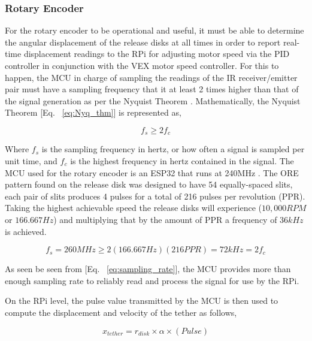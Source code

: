 
\subsubsection{Rotary Encoder}

\indent\indent For the rotary encoder to be operational and useful, it must be able to determine the angular displacement of the release disks at all times in order to report real-time displacement readings to the RPi for adjusting motor speed via the PID controller in conjunction with the VEX motor speed controller. For this to happen, the MCU in charge of sampling the readings of the IR receiver/emitter pair must have a sampling frequency that it at least 2 times higher than that of the signal generation as per the Nyquist Theorem \cite{Nyq_thm}. Mathematically, the Nyquist Theorem [Eq. ~\ref{eq:Nyq_thm}] is represented as,

\begin{equation}
	f_s \geq 2f_c
    \label{eq:Nyq_thm}
\end{equation}

Where $f_s$ is the sampling frequency in hertz, or how often a signal is sampled per unit time, and $f_c$ is the highest frequency in hertz contained in the signal. The MCU used for the rotary encoder is an ESP32 that runs at 240MHz \cite{espressif}. The ORE pattern found on the release disk was designed to have 54 equally-spaced slits, each pair of slits produces 4 pulses for a total of 216 pulses per revolution (PPR). Taking the highest achievable speed the release disks will experience ($10,000 RPM$ or $166.667 Hz$) and multiplying that by the amount of PPR a frequency of $36kHz$ is achieved.

\begin{equation}
	f_s = 260MHz \geq 2(166.667Hz)(216PPR) = 72kHz = 2f_c
    \label{eq:sampling_rate}
\end{equation}

As seen be seen from [Eq. ~\ref{eq:sampling_rate}], the MCU provides more than enough sampling rate to reliably read and process the signal for use by the RPi.

On the RPi level, the pulse value transmitted by the MCU is then used to compute the displacement and velocity of the tether as follows,

\begin{equation}
	x_{tether} = r_{disk}\times\alpha\times(Pulse)
    \label{eq:tether_dsiplacement}
\end{equation}

